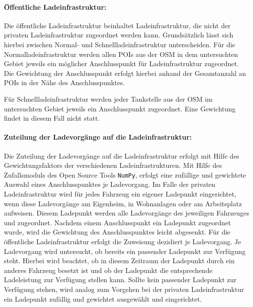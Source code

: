 \paragraph{Öffentliche Ladeinfrastruktur:}

Die öffentliche Ladeinfrastruktur beinhaltet Ladeinfrastruktur, die nicht der privaten Ladeinfrastruktur zugeordnet werden kann.
Grundsätzlich lässt sich hierbei zwischen Normal- und Schnellladeinfrastruktur unterscheiden.
Für die Normalladeinfrastruktur werden allen \glspl{POI} aus der \gls{OSM} \cite{OpenStreetMapFoundation} in dem untersuchten Gebiet jeweils ein möglicher Anschlusspunkt für Ladeinfrastruktur zugeordnet.
Die Gewichtung der Anschlusspunkt erfolgt hierbei anhand der Gesamtanzahl an \glspl{POI} in der Nähe des Anschlusspunktes.\medskip

Für Schnellladeinfrastruktur werden jeder Tankstelle aus der \gls{OSM} \cite{OpenStreetMapFoundation} im untersuchten Gebiet jeweils ein Anschlusspunkt zugeordnet.
Eine Gewichtung findet in diesem Fall nicht statt.


\paragraph{Zuteilung der Ladevorgänge auf die Ladeinfrastruktur:}

Die Zuteilung der Ladevorgänge auf die Ladeinfrastruktur erfolgt mit Hilfe des Gewichtungsfaktors der verschiedenen Ladeinfrastrukturen.
Mit Hilfe des Zufallsmoduls des Open Source Tools \texttt{NumPy}, erfolgt eine zufällige und gewichtete Auswahl eines Anschlusspunktes je Ladevorgang.
Im Falle der privaten Ladeinfrastruktur wird für jedes Fahrzeug ein eigener Ladepunkt eingerichtet, wenn diese Ladevorgänge am Eigenheim, in Wohnanlagen oder am Arbeitsplatz aufweisen.
Diesem Ladepunkt werden alle Ladevorgänge des jeweiligen Fahrzeuges und \UCs zugeordnet.
Nachdem einem Anschlusspunkt ein Ladepunkt zugeordnet wurde, wird die Gewichtung des Anschlusspunktes leicht abgesenkt.
Für die öffentliche Ladeinfrastruktur erfolgt die Zuweisung dezidiert je Ladevorgang.
Je Ladevorgang wird untersucht, ob bereits ein passender Ladepunkt zur Verfügung steht.
Hierbei wird beachtet, ob in diesem Zeitraum der Ladepunkt durch ein anderes Fahrzeug besetzt ist und ob der Ladepunkt die entsprechende Ladeleistung zur Verfügung stellen kann.
Sollte kein passender Ladepunkt zur Verfügung stehen, wird analog zum Vorgehen bei der privaten Ladeinfrastruktur ein Ladepunkt zufällig und gewichtet ausgewählt und eingerichtet.


